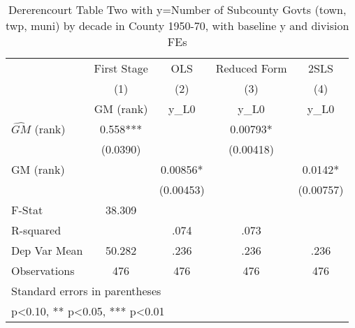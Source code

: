 \begin{table}[htbp]\centering
\def\sym#1{\ifmmode^{#1}\else\(^{#1}\)\fi}
\caption{Dererencourt Table Two with y=Number of Subcounty Govts (town, twp, muni) by decade in County 1950-70, with baseline y and division FEs}
\begin{tabular}{l*{4}{c}}
\toprule
                    & First Stage   &         OLS   &Reduced Form   &        2SLS   \\
                    &\multicolumn{1}{c}{(1)}&\multicolumn{1}{c}{(2)}&\multicolumn{1}{c}{(3)}&\multicolumn{1}{c}{(4)}\\
                    &\multicolumn{1}{c}{GM  (rank)}&\multicolumn{1}{c}{y\_L0}&\multicolumn{1}{c}{y\_L0}&\multicolumn{1}{c}{y\_L0}\\
\midrule
$\hat{GM}$ (rank)   &       0.558***&               &     0.00793*  &               \\
                    &    (0.0390)   &               &   (0.00418)   &               \\
\addlinespace
GM  (rank)          &               &     0.00856*  &               &      0.0142*  \\
                    &               &   (0.00453)   &               &   (0.00757)   \\
\midrule
F-Stat              &      38.309   &               &               &               \\
R-squared           &               &        .074   &        .073   &               \\
Dep Var Mean        &      50.282   &        .236   &        .236   &        .236   \\
Observations        &         476   &         476   &         476   &         476   \\
\bottomrule
\multicolumn{5}{l}{\footnotesize Standard errors in parentheses}\\
\multicolumn{5}{l}{\footnotesize * p<0.10, ** p<0.05, *** p<0.01}\\
\end{tabular}
\end{table}

